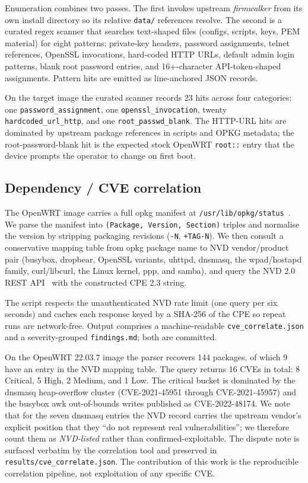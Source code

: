 \documentclass[conference]{IEEEtran}
\begin{document}
Enumeration combines two passes. The first invokes upstream
\textit{firmwalker} from its own install directory so its relative
\texttt{data/} references resolve. The second is a curated regex
scanner that searches text-shaped files (configs, scripts, keys,
PEM material) for eight patterns: private-key headers, password
assignments, telnet references, OpenSSL invocations, hard-coded
HTTP URLs, default admin login patterns, blank root password
entries, and 16+-character API-token-shaped assignments. Pattern
hits are emitted as line-anchored JSON records.

On the target image the curated scanner records 23 hits across
four categories: one \texttt{password\_assignment}, one
\texttt{openssl\_invocation}, twenty \texttt{hardcoded\_url\_http},
and one \texttt{root\_passwd\_blank}. The HTTP-URL hits are
dominated by upstream package references in scripts and OPKG
metadata; the root-password-blank hit is the expected stock
OpenWRT \texttt{root::} entry that the device prompts the operator
to change on first boot.

\subsection{Dependency / CVE correlation}

The OpenWRT image carries a full opkg manifest at
\texttt{/usr/lib/opkg/status}~\cite{openwrtOpkg}. We parse the
manifest into \texttt{(Package, Version, Section)} triples and
normalise the version by stripping packaging revisions
(\texttt{-N}, \texttt{+TAG-N}). We then consult a conservative
mapping table from opkg package name to NVD vendor/product pair
(busybox, dropbear, OpenSSL variants, uhttpd, dnsmasq, the
wpad/hostapd family, curl/libcurl, the Linux kernel, ppp, and
samba), and query the NVD 2.0 REST API~\cite{nvdApi} with the
constructed CPE 2.3 string.

The script respects the unauthenticated NVD rate limit (one query
per six seconds) and caches each response keyed by a SHA-256 of
the CPE so repeat runs are network-free. Output comprises a
machine-readable \texttt{cve\_correlate.json} and a
severity-grouped \texttt{findings.md}; both are committed.

On the OpenWRT 22.03.7 image the parser recovers 144 packages, of
which 9 have an entry in the NVD mapping table. The query returns
16 CVEs in total: 8 Critical, 5 High, 2 Medium, and 1 Low. The
critical bucket is dominated by the dnsmasq heap-overflow cluster
(CVE-2021-45951 through CVE-2021-45957) and the busybox awk
out-of-bounds writes published as CVE-2022-48174. We note that for
the seven dnsmasq entries the NVD record carries the upstream vendor's
explicit position that they ``do not represent real vulnerabilities'';
we therefore count them as \emph{NVD-listed} rather than
confirmed-exploitable. The dispute note is surfaced verbatim by the
correlation tool and preserved in \texttt{results/cve\_correlate.json}.
The contribution of this work is the reproducible correlation
pipeline, not exploitation of any specific CVE.
\end{document}
